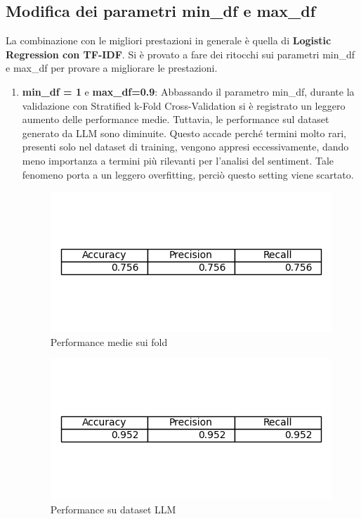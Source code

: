 \documentclass[12pt,a4paper]{report} %
\begin{document}
\subsection{Modifica dei parametri min\_df e max\_df}
La combinazione con le migliori prestazioni in generale è quella di \textbf{Logistic Regression con TF-IDF}. Si è provato a fare dei ritocchi sui parametri min\_df e max\_df per provare a migliorare le prestazioni.
\begin{enumerate}
    \item  \textbf{min\_df = 1} e \textbf{max\_df=0.9}: Abbassando il parametro min\_df, durante la validazione con Stratified k-Fold Cross-Validation si è registrato un leggero aumento delle performance medie. Tuttavia, le performance sul dataset generato da LLM sono diminuite. Questo accade perché termini molto rari, presenti solo nel dataset di training, vengono appresi eccessivamente, dando meno importanza a termini più rilevanti per l’analisi del sentiment. Tale fenomeno porta a un leggero overfitting, perciò questo setting viene scartato.
    \begin{figure}[H]
        \centering
        \includegraphics[width=0.75\linewidth]{immagini_modeling/parameter1.png}
        \caption{Performance medie sui fold}
        \label{fig:enter-label}
    \end{figure}
\begin{figure}[H]
    \centering
    \includegraphics[width=0.75\linewidth]{immagini_modeling/parameter2.png}
    \caption{Performance su dataset LLM}
    \label{fig:enter-label}

\end{figure}
\end{enumerate}
\end{document}
